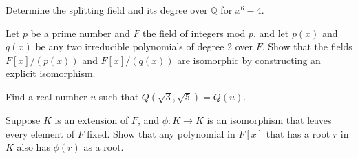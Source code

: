 \documentclass[12pt,letterpaper]{hmcpset}
\newcommand{\Qq}{\mathbb{Q}}
\begin{document}

\begin{problem}[13.4.4]
  Determine the splitting field and its degree over $\Qq$ for $x^6-4$.
\end{problem}
\begin{solution}
\vfill
\end{solution}
\newpage

\begin{problem}[B.]
  Let $p$ be a prime number and $F$ the field of integers mod $p$, and let $p(x)$ and $q(x)$ be any two irreducible polynomials of degree 2 over $F$. Show that the fields $F[x]/(p(x))$ and $F[x]/(q(x))$ are isomorphic by constructing an explicit isomorphism.
\end{problem}
\begin{solution}
	\vfill
\end{solution}
\newpage

\begin{problem}[C.]
  Find a real number $u$ such that $Q(\sqrt{3},\sqrt{5})=Q(u)$.
\end{problem}
\begin{solution}
	\vfill
\end{solution}
\newpage

\begin{problem}[D.]
	Suppose $K$ is an extension of $F$, and $\phi : K \to K$ is an isomorphism that leaves every element of $F$ fixed. Show that any polynomial in $F[x]$ that has a root $r$ in $K$ also has $\phi(r)$ as a root.
\end{problem}
\begin{solution}
	\vfill
\end{solution}
\end{document}
